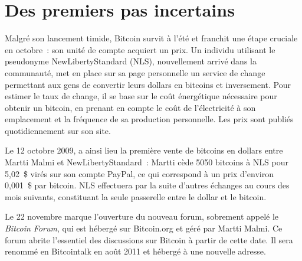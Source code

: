 
\vspace{-1em}
\section*{Des premiers pas incertains}

Malgré son lancement timide, Bitcoin survit à l'été et franchit une étape cruciale en octobre~: son unité de compte acquiert un prix. Un individu utilisant le pseudonyme NewLibertyStandard (NLS), nouvellement arrivé dans la communauté, met en place sur sa page personnelle un service de change permettant aux gens de convertir leurs dollars en bitcoins et inversement. Pour estimer le taux de change, il se base sur le coût énergétique nécessaire pour obtenir un bitcoin, en prenant en compte le coût de l'électricité à son emplacement et la fréquence de sa production personnelle. Les prix sont publiés quotidiennement sur son site.

Le 12 octobre 2009, a ainsi lieu la première vente de bitcoins en dollars entre Martti Malmi et NewLibertyStandard~: Martti cède 5050 bitcoins à NLS pour 5,02~\$ virés sur son compte PayPal, ce qui correspond à un prix d'environ 0,001~\$ par bitcoin. NLS effectuera par la suite d'autres échanges au cours des mois suivants, constituant la seule passerelle entre le dollar et le bitcoin. %

Le 22 novembre marque l'ouverture du nouveau forum, sobrement appelé le \emph{Bitcoin Forum}, qui est hébergé sur Bitcoin.org et géré par Martti Malmi. Ce forum abrite l'essentiel des discussions sur Bitcoin à partir de cette date. Il sera renommé en Bitcointalk en août 2011 et hébergé à une nouvelle adresse.

